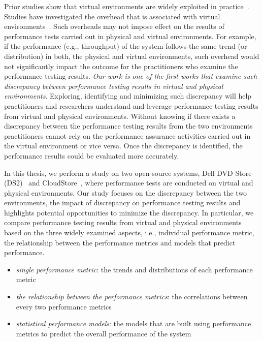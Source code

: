 \begin{sloppypar}
Prior studies show that virtual environments are widely exploited in practice~\cite{Cito:2015:MCA:2786805.2786826,Nguyen:2012:ADP:2188286.2188344,xiong2013vperfguard}. Studies have investigated the overhead that is associated with virtual environments~\cite{menon2005diagnosing}. Such overheads may not impose effect on the results of performance tests carried out in physical and virtual environments. For example, if the performance (e.g., throughput) of the system follows the same trend (or distribution) in both, the physical and virtual environments, such overhead would not significantly impact the outcome for the practitioners who examine the performance testing results. \textit{Our work is one of the first works that examine such discrepancy between performance testing results in virtual and physical environments}. Exploring, identifying and minimizing such discrepancy will help practitioners and researchers understand and leverage performance testing results from virtual and physical environments. Without knowing if there exists a discrepancy between the performance testing results from the two environments practitioners cannot rely on the performance assurance activities carried out in the virtual environment or vice versa. Once the discrepancy is identified, the performance results could be evaluated more accurately.
\end{sloppypar}

In this thesis, we perform a study on two open-source systems, Dell DVD Store (DS2)~\cite{delldvd} and CloudStore~\cite{cloudstore}, where performance tests are conducted on virtual and physical environments. Our study focuses on the discrepancy between the two environments, the impact of discrepancy on performance testing results and highlights potential opportunities to minimize the discrepancy. In particular, we compare performance testing results from virtual and physical environments based on the three widely examined aspects, i.e., individual performance metric, the relationship between the performance metrics and models that predict performance. 

\begin{itemize}
	\item \textit{single performance metric}: the trends and distributions of each performance metric
	\item \textit{the relationship between the performance metrics}: the correlations between every two performance metrics 
	\item \textit{statistical performance models}: the models that are built using performance metrics to predict the overall performance of the system
	
\end{itemize}

